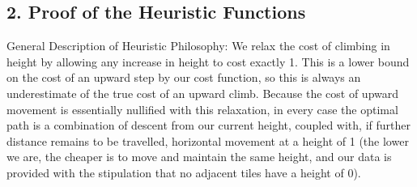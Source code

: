 \documentclass[11pt]{article}  %
\begin{document}
\subsection*{2. Proof of the Heuristic Functions}
General Description of Heuristic Philosophy: We relax the cost of climbing in height by allowing any increase in height to cost exactly 1. This is a lower bound on the cost of an upward step by our cost function, so this is always an underestimate of the true cost of an upward climb. Because the cost of upward movement is essentially nullified with this relaxation, in every case the optimal path is a combination of descent from our current height, coupled with, if further distance remains to be travelled, horizontal movement at a height of 1 (the lower we are, the cheaper is to move and maintain the same height, and our data is provided with the stipulation that no adjacent tiles have a height of 0).
\end{document}
